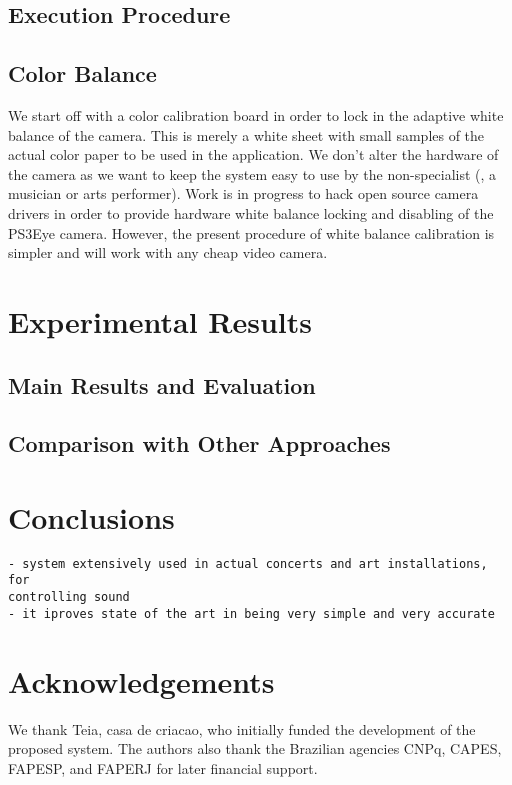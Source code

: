 \documentclass[a4paper,12pt]{elsarticle_rfabbri}
\begin{document}
\subsection{Execution Procedure}

\subsection{Color Balance}
We start off with a color calibration board in order to lock in the adaptive white
balance of the camera. This is merely a white sheet with small samples of the
actual color paper to be used in the application. We don't alter the hardware of
the camera as we want to keep the system easy to use by the non-specialist (\eg,
a musician or arts performer). Work is in progress to hack open source camera
drivers in order to provide hardware white balance locking and disabling of
the PS3Eye camera. However, the present procedure of white balance
calibration is simpler and will work with any cheap video camera.

\section{Experimental Results}

\subsection{Main Results and Evaluation}
\subsection{Comparison with Other Approaches}


\section{Conclusions}

\begin{verbatim}
- system extensively used in actual concerts and art installations, for
controlling sound
- it iproves state of the art in being very simple and very accurate
\end{verbatim}

\section*{Acknowledgements}
We thank Teia, casa de criacao, who initially funded the development of the proposed
system.  The authors also thank the Brazilian agencies CNPq, CAPES, FAPESP, and
FAPERJ for later financial support.



\end{document}

